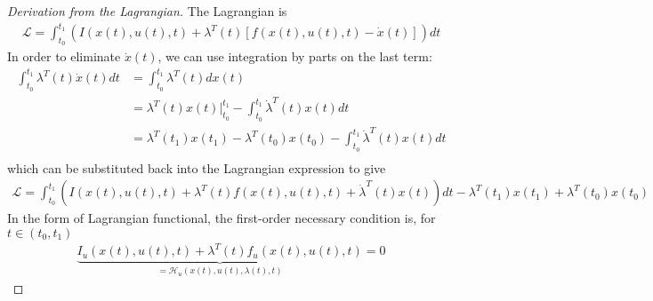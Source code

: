 \documentclass[11pt]{elegantbook}
\begin{document}
\begin{proof}[Derivation from the Lagrangian]
    The Lagrangian is
    \begin{equation}
        \begin{aligned}
            \mathcal{L}=\int_{t_0}^{t_1}\left(I(x(t),u(t),t)+\lambda^T(t)\left[f(x(t),u(t),t)-\dot{x}(t)\right]\right)dt
        \end{aligned}
        \nonumber
    \end{equation}
    In order to eliminate $\dot{x}(t)$, we can use integration by parts on the last term:
    \begin{equation}
        \begin{aligned}
            \int_{t_0}^{t_1}\lambda^T(t)\dot{x}(t)dt&=\int_{t_0}^{t_1}\lambda^T(t)dx(t)\\
            &=\lambda^T(t)x(t)\big|_{t_0}^{t_1}-\int_{t_0}^{t_1}\dot{\lambda}^T(t)x(t)dt\\
            &=\lambda^T(t_1)x(t_1)-\lambda^T(t_0)x(t_0)-\int_{t_0}^{t_1}\dot{\lambda}^T(t)x(t)dt\\
        \end{aligned}
        \nonumber
    \end{equation}
    which can be substituted back into the Lagrangian expression to give
    \begin{equation}
        \begin{aligned}
            \mathcal{L}=\int_{t_0}^{t_1}\left(I(x(t),u(t),t)+\lambda^T(t)f(x(t),u(t),t)+\dot{\lambda}^T(t)x(t)\right)dt-\lambda^T(t_1)x(t_1)+\lambda^T(t_0)x(t_0)
        \end{aligned}
        \nonumber
    \end{equation}
    In the form of Lagrangian functional, the first-order necessary condition is, for $t\in(t_0,t_1)$
    \begin{equation}
        \begin{aligned}
            \underbrace{I_u(x(t),u(t),t)+\lambda^T(t)f_u(x(t),u(t),t)}_{=\mathcal{H}_u(x(t),u(t),\lambda(t),t)}=0
        \end{aligned}
        \nonumber
    \end{equation}
\end{proof}
\end{document}
